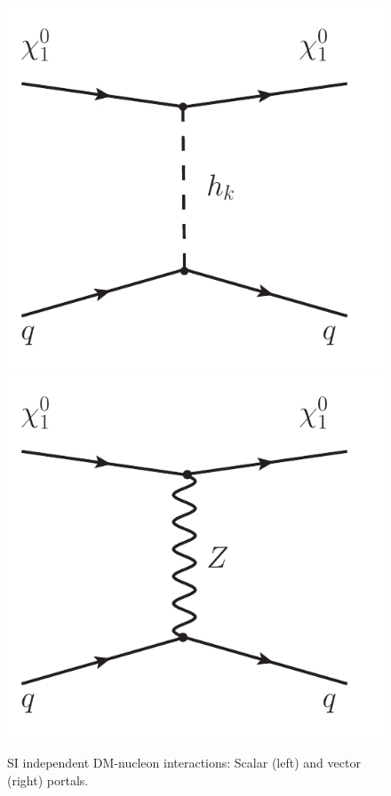 \documentclass[12pt,letterpaper]{article}
\begin{document}
\begin{figure}
\centering
\includegraphics[scale=0.5]{scalar-SI} \hspace{2 cm}
\includegraphics[scale=0.5]{vector-SI}
\caption{SI independent DM-nucleon interactions: Scalar (left) and vector (right) portals.}
\label{fig:SI-diagrams}
\end{figure}
\end{document}
